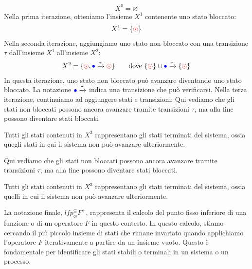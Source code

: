 \[
  X^0 = \varnothing
\]
Nella prima iterazione, otteniamo l'insieme $X^1$ contenente uno stato bloccato:
\[
  X^1 = \{\textcolor{red}{\odot} \} 
\]
Nella seconda iterazione, aggiungiamo uno stato non bloccato con una transizione $\tau$ dall'insieme $X^1$ all'insieme $X^2$:
\[
  X^2 = \{\textcolor{red}{\odot}, \textcolor{blue}{\bullet}\xrightarrow[]{\tau} \textcolor{red}{\odot} \} 
  \qquad \text{dove } \{\textcolor{red}{\odot}\} \cup \textcolor{blue}{\bullet}\xrightarrow[]{\tau}\{ \textcolor{red}{\odot}\}
\]
In questa iterazione, uno stato non bloccato può avanzare diventando uno stato bloccato. La notazione $\textcolor{blue}{\bullet}\xrightarrow[]{\tau}$ indica una transizione che può verificarsi.
Nella terza iterazione, continuiamo ad aggiungere stati e transizioni:
Qui vediamo che gli stati non bloccati possono ancora avanzare tramite transizioni $\tau$, ma alla fine possono diventare stati bloccati.

Tutti gli stati contenuti in $X^3$ rappresentano gli stati terminati del sistema, ossia quegli stati in cui il sistema non può avanzare ulteriormente.

Qui vediamo che gli stati non bloccati possono ancora avanzare tramite
transizioni $\tau$, ma alla fine possono diventare stati bloccati.

Tutti gli stati contenuti in $X^3$ rappresentano gli stati terminati
del sistema, ossia quelli in cui il sistema non può avanzare ulteriormente.

La notazione finale, $\textit{lfp}^{\subseteq}_{\varnothing}F^+$,
rappresenta il calcolo del punto fisso inferiore di una funzione o di
un operatore $F$ in questo contesto. In questo calcolo, stiamo cercando
il più piccolo insieme di stati che rimane invariato quando applichiamo
l'operatore $F$ iterativamente a partire da un insieme vuoto. Questo è
fondamentale per identificare gli stati stabili o terminali in un sistema
o un processo.

